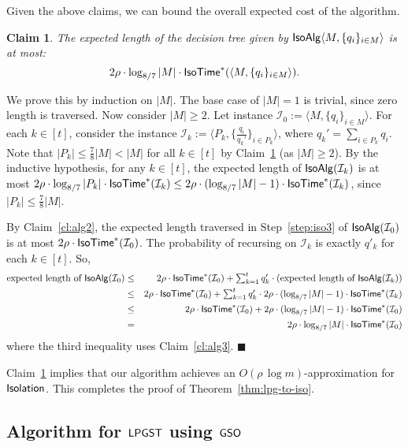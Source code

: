 \documentclass[11pt]{article}
\newtheorem{claim}[thm]{Claim}
\def\is{\mathcal{I}}
\def\iso{\ensuremath{{\sf IsoAlg}}\xspace}
\def\isoprob{\ensuremath{{\sf Isolation}}\xspace}
\def\isotime{\ensuremath{{\sf IsoTime}}}
\def\isoopt{{\isotime}^*}
\def\lpgst{\ensuremath{{\sf LPGST}}\xspace}
\def\gso{\ensuremath{{\sf GSO}}\xspace}
\def\ts{\textstyle}
\newenvironment{pf}{

\noindent{\bf Proof:}} {\hfill$\blacksquare$


}
\begin{document}
Given the above claims, we can bound the overall expected cost of the algorithm.
\begin{claim}
  \label{cl:alg4}
  The expected length of the  decision tree  given by $\iso\langle M,
  \{q_i\}_{i\in M}\rangle$ is at most:
  $$2\rho\cdot \log_{8/7} |M|\cdot \isoopt(\langle M, \{q_i\}_{i\in
  M}\rangle).$$
\end{claim}
\begin{pf}
We prove this by induction on $|M|$. The base case of $|M|=1$ is  trivial, since zero length is traversed. Now
consider $|M|\ge  2$. Let instance $\is_0:=\langle M, \{q_i\}_{i\in M}\rangle$. For each $k\in [t]$, consider the
 instance $\is_k:=\langle  P_k, \{\frac{q_i}{q_k'}\}_{i\in P_k}\rangle$, where $q_k' = \sum_{i
    \in P_k} q_i$. Note that $|P_k|\le \frac78 |M|<|M|$ for all $k\in [t]$ by Claim~\ref{cl:alg4} (as $|M|\ge 2$). By the inductive hypothesis, for any $k\in [t]$, the
  expected length of $\iso(\is_k)$ is at most $2\rho\cdot \log_{8/7}
  |P_k|\cdot \isoopt(\is_k)\le 2\rho\cdot (\log_{8/7} |M|-1)\cdot
  \isoopt(\is_k)$, since $|P_k|\le \frac78 |M|$.

  By Claim~\ref{cl:alg2}, the expected length traversed in
  Step~\ref{step:iso3} of $\iso(\is_0)$ is at most $2\rho\cdot
  \isoopt(\is_0)$. The probability of recursing on $\is_k$ is exactly
  $q'_k$ for each $k\in [t]$. So, 
    \begin{eqnarray*}
    \mbox{expected length of }\iso(\is_0) &\le &2\rho\cdot \isoopt(\is_0)+ \ts \sum_{k=1}^t q'_k\cdot \left(\mbox{expected length of }\iso(\is_k)\right)\\
    &\le &2\rho\cdot \isoopt(\is_0)+ \ts \sum_{k=1}^t q'_k\cdot 2\rho \cdot
    (\log_{8/7} |M|-1)\cdot \isoopt(\is_k)\\
    &\le &2\rho\cdot \isoopt(\is_0)+ 2\rho \cdot (\log_{8/7} |M|-1)\cdot
    \isoopt(\is_0)\\
    &= &2\rho \cdot \log_{8/7} |M|\cdot \isoopt(\is_0)
  \end{eqnarray*}
where the third inequality uses Claim~\ref{cl:alg3}.
\end{pf}

Claim~\ref{cl:alg4} implies that our algorithm achieves  an $O(\rho\, \log m)$-approximation 
  for \isoprob. This  completes the proof of Theorem~\ref{thm:lpg-to-iso}.






\subsection{Algorithm for \lpgst using \gso}
\label{subsec:grp-lat}
\end{document}
